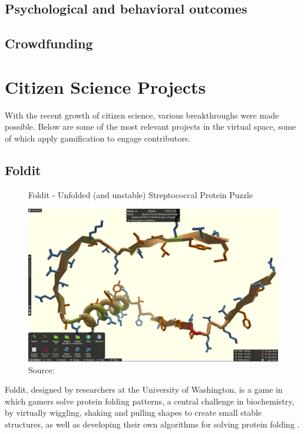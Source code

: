 \subsection{Psychological and behavioral outcomes}

\subsection{Crowdfunding}

\section{Citizen Science Projects}

With the recent growth of citizen science, various breakthroughs were made possible. Below are some of the most relevant projects in the virtual space, some of which apply gamification to engage contributors.

\subsection{Foldit}

\begin{figure}[ht]
    \centering
    \caption{Foldit - Unfolded (and unstable) Streptococcal Protein Puzzle}
    \includegraphics[width=0.8\linewidth]{images/background/foldit-problem.png}
    \caption*{Source: \cite{foldit-protein-problem}}
    \label{fig:foldit-problem}
\end{figure}

Foldit, designed by researchers at the University of Washington, is a game in which gamers solve protein folding patterns, a central challenge in biochemistry, by virtually wiggling, shaking and pulling shapes to create small stable structures, as well as developing their own algorithms for solving protein folding \cite{bourzac2008enlisting}. 

